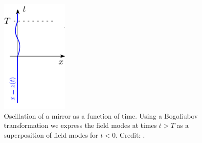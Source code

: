 \begin{figure}
    \includegraphics[width=1.3in, keepaspectratio]{figures/intro/Nation2011_transformation.png}
    \caption{Oscillation of a mirror as a function of time. Using a Bogoliubov transformation we express the field modes 
    at times $t>T$ as a superposition of field modes for $t<0$. Credit: \protect\cite{Nation2011}.}
    \label{fig:Nation_transformation}
\end{figure}

\newpage

